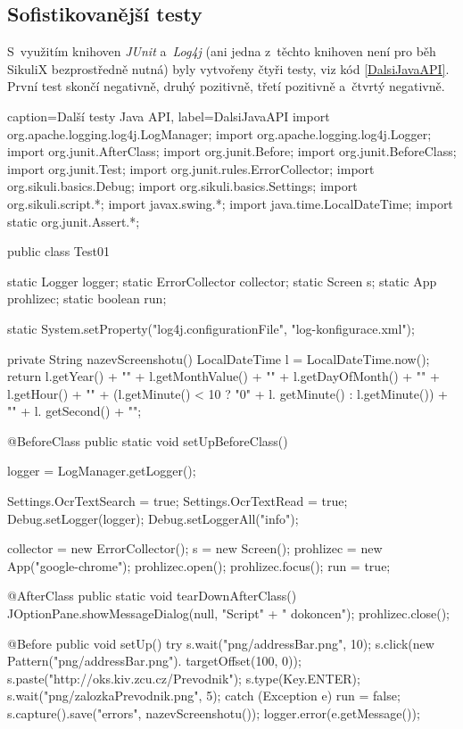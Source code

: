 \documentclass{bakalarka}
\begin{document}
		\subsection{Sofistikovanější testy}
		S~využitím knihoven \emph{JUnit} a~\emph{Log4j} (ani jedna z~těchto knihoven není pro běh SikuliX bezprostředně nutná) byly vytvořeny čtyři testy, viz kód \ref{DalsiJavaAPI}. První test skončí negativně, druhý pozitivně, třetí pozitivně a~čtvrtý negativně.
		\begin{lstjava}{caption={Další testy Java API}, label={DalsiJavaAPI}}
import org.apache.logging.log4j.LogManager;
import org.apache.logging.log4j.Logger;
import org.junit.AfterClass;
import org.junit.Before;
import org.junit.BeforeClass;
import org.junit.Test;
import org.junit.rules.ErrorCollector;
import org.sikuli.basics.Debug;
import org.sikuli.basics.Settings;
import org.sikuli.script.*;
import javax.swing.*;
import java.time.LocalDateTime;
import static org.junit.Assert.*;

public class Test01 {

  static Logger logger;
  static ErrorCollector collector;
  static Screen s;
  static App prohlizec;
  static boolean run;

  static {
    System.setProperty("log4j.configurationFile",
      "log-konfigurace.xml");
  }

  private String nazevScreenshotu() {
    LocalDateTime l = LocalDateTime.now();
      return l.getYear() + "" + l.getMonthValue() +
        "" + l.getDayOfMonth() + "" + l.getHour() +
        "" + (l.getMinute() < 10 ? "0" + l.
        getMinute() : l.getMinute()) + "" + l.
        getSecond() + "";
  }

  @BeforeClass
  public static void setUpBeforeClass() {
    logger = LogManager.getLogger();

    Settings.OcrTextSearch = true;
    Settings.OcrTextRead = true;
    Debug.setLogger(logger);
    Debug.setLoggerAll("info");

    collector = new ErrorCollector();
    s = new Screen();
    prohlizec = new App("google-chrome");
    prohlizec.open();
    prohlizec.focus();
    run = true;
    }

  @AfterClass
  public static void tearDownAfterClass() {
    JOptionPane.showMessageDialog(null, "Script" +
      " dokoncen");
    prohlizec.close();
  }

  @Before
  public void setUp() {
    try {
      s.wait("png/addressBar.png", 10);
      s.click(new Pattern("png/addressBar.png").
        targetOffset(100, 0));
      s.paste("http://oks.kiv.zcu.cz/Prevodnik");
      s.type(Key.ENTER);
      s.wait("png/zalozkaPrevodnik.png", 5);
    } catch (Exception e) {
      run = false;
      s.capture().save("errors", nazevScreenshotu());
      logger.error(e.getMessage());
    }
  }

}
\end{lstjava}
\end{document}
